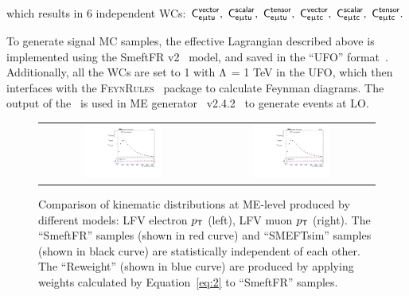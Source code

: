 which results in 6 independent \acp{WC}: $\textsf{C}^{\textsf{vector}}_{\textsf{e}\upmu\textsf{t{u}}},~\textsf{C}^{\textsf{scalar}}_{\textsf{e}\upmu\textsf{t{u}}},~\textsf{C}^{\textsf{tensor}}_{\textsf{e}\upmu\textsf{t{u}}},~\textsf{C}^{\textsf{vector}}_{\textsf{e}\upmu\textsf{t{c}}},~\textsf{C}^{\textsf{scalar}}_{\textsf{e}\upmu\textsf{t{c}}},~\textsf{C}^{\textsf{tensor}}_{\textsf{e}\upmu\textsf{t{c}}}.$  

To generate signal \ac{MC} samples, the effective Lagrangian described above is implemented using the SmeftFR v2~\cite{Dedes:2019uzs} model, and saved in the ``UFO'' format~\cite{Degrande:2011ua}. Additionally, all the \acp{WC} are set to 1 with $\mathrm{\Lambda}$ = 1 TeV in the UFO, which then interfaces with the \textsc{FeynRules}~\cite{Christensen:2008py} package to calculate Feynman diagrams. The output of the \FR~is used in \ac{ME} generator \MG~v2.4.2~\cite{Alwall:2014hca} to generate events at \ac{LO}.

\begin{figure}[tbh!]
 \begin{center}
 \begin{tabular}{cc}
  \includegraphics[width=0.48\textwidth]{figures/Part3/Samples/LFVePt}&
    \includegraphics[width=0.48\textwidth]{figures/Part3/Samples/LFVmuPt}\\
 \end{tabular}
 \caption{Comparison of kinematic distributions at \ac{ME}-level produced by different models: LFV electron $p_{\textsf{T}}$ (left), LFV muon $p_{\textsf{T}}$ (right). The ``SmeftFR'' samples (shown in red curve) and  ``SMEFTsim'' samples (shown in black curve) are statistically independent of each other. The ``Reweight'' (shown in blue curve) are produced by applying weights calculated by Equation~\ref{eq:2} to ``SmeftFR'' samples.}
 \label{fig:reweight}
 \end{center}
\end{figure}

